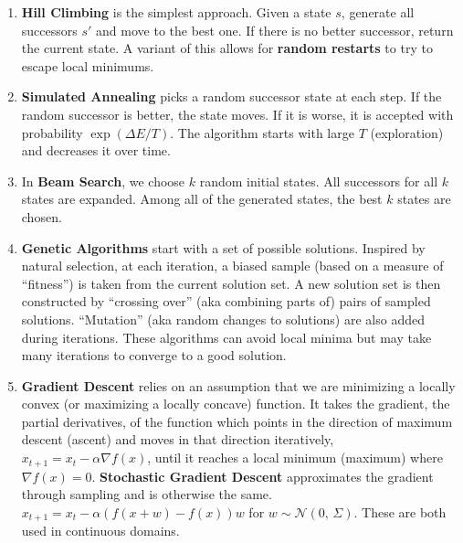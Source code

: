 \documentclass[a4paper]{article}
\begin{document}
\begin{enumerate}
    \item \textbf{Hill Climbing} is the simplest approach. Given a state $s$, generate all successors $s'$ and move to the best one. If there is no better successor, return the current state. A variant of this allows for \textbf{random restarts} to try to escape local minimums.
    \item \textbf{Simulated Annealing} picks a random successor state at each step. If the random successor is better, the state moves. If it is worse, it is accepted with probability $\exp(\Delta E / T)$. The algorithm starts with large $T$ (exploration) and decreases it over time. 
    \item In \textbf{Beam Search}, we choose $k$ random initial states. All successors for all $k$ states are expanded. Among all of the generated states, the best $k$ states are chosen. 
    \item \textbf{Genetic Algorithms} start with a set of possible solutions. Inspired by natural selection, at each iteration, a biased sample (based on a measure of ``fitness'') is taken from the current solution set. A new solution set is then constructed by ``crossing over'' (aka combining parts of) pairs of sampled solutions. ``Mutation'' (aka random changes to solutions) are also added during iterations. These algorithms can avoid local minima but may take many iterations to converge to a good solution.
    \item \textbf{Gradient Descent} relies on an assumption that we are minimizing a locally convex (or maximizing a locally concave) function. It takes the gradient, the partial derivatives, of the function which points in the direction of maximum descent (ascent) and moves in that direction iteratively, $x_{t+1} = x_t - \alpha \nabla f(x)$, until it reaches a local minimum (maximum) where $\nabla f(x) = 0$. \textbf{Stochastic Gradient Descent} approximates the gradient through sampling and is otherwise the same. $x_{t+1} = x_t - \alpha \left(f(x+w) - f(x)\right)w$ for $w \sim \mathcal{N}(0,\,\Sigma)$. These are both used in continuous domains.
\end{enumerate}

\clearpage
\end{document}
